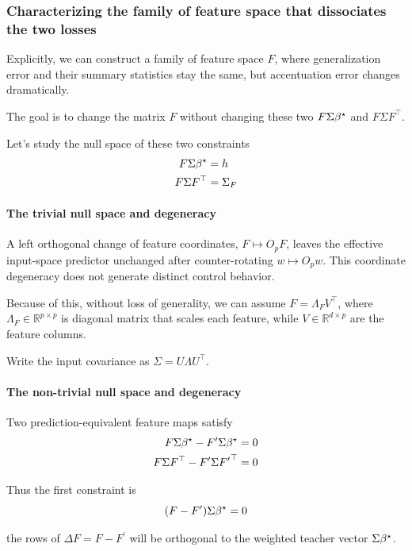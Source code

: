 \subsubsection{Characterizing the family of feature space that dissociates the two
losses}

Explicitly, we can construct a family of feature space $F$, where
generalization error and their summary statistics stay the same, but
accentuation error changes dramatically.

The goal is to change the matrix $F$ without changing these two $F\Sigma{\beta^{\star}}$
and $F\Sigma F^{\top}$.

Let's study the null space of these two constraints
\begin{align*}
F\Sigma{\beta^{\star}} & =h\\
F\Sigma F^{\top} & =\Sigma_{F}
\end{align*}


\paragraph{The trivial null space and degeneracy}

A left orthogonal change of feature coordinates, $F\mapsto O_pF$, leaves the
effective input-space predictor unchanged after counter-rotating
$w\mapsto O_pw$. This coordinate degeneracy does not generate distinct
control behavior.

Because of this, without loss of generality, we can assume $F=\Lambda_{F}V^{\top}$,
where $\Lambda_{F}\in\mathbb{R}^{p\times p}$ is diagonal matrix that
scales each feature, while $V\in\mathbb{R}^{d\times p}$ are the feature
columns.

Write the input covariance as $\Sigma=U\Lambda U^{\top}$.

\paragraph{The non-trivial null space and degeneracy}

Two prediction-equivalent feature maps satisfy
\begin{align*}
F\Sigma{\beta^{\star}}-F^{\prime}\Sigma{\beta^{\star}} & =0\\
F\Sigma F^{\top}-F^{\prime}\Sigma {F^\prime}^{\top} & =0
\end{align*}

Thus the first constraint is
\[
(F-F^{\prime})\Sigma{\beta^{\star}}=0
\]

the rows of $\Delta F=F-F^{\prime}$ will be orthogonal to the weighted
teacher vector $\Sigma{\beta^{\star}}$.

